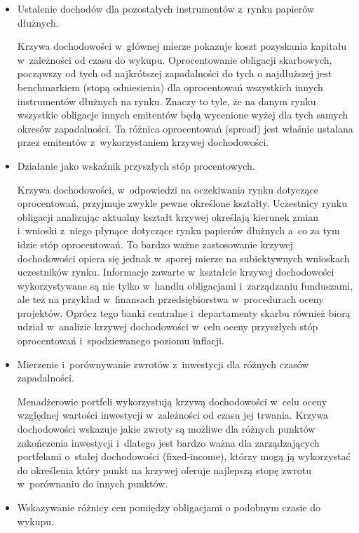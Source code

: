 \documentclass[12pt,a4paper,twoside,openany]{book}
\begin{document}
\begin{itemize}
\item Ustalenie dochodów dla pozostałych instrumentów z~rynku papierów dłużnych.

Krzywa dochodowości w~głównej mierze pokazuje koszt pozyskania kapitału w~zależności od czasu do wykupu. Oprocentowanie obligacji skarbowych, począwszy od tych od najkrótszej zapadalności do tych o najdłuższej jest benchmarkiem (stopą odniesienia) dla oprocentowań wszystkich innych instrumentów dłużnych na rynku. Znaczy to tyle, że na danym rynku wszystkie obligacje innych emitentów będą wycenione wyżej dla tych samych okresów zapadalności. Ta różnica oprocentowań (spread) jest właśnie ustalana przez emitentów z~wykorzystaniem krzywej dochodowości.

\item Działanie jako wskaźnik przyszłych stóp procentowych.

Krzywa dochodowości, w~odpowiedzi na oczekiwania rynku dotyczące oprocentowań, przyjmuje zwykle pewne określone kształty. Uczestnicy rynku obligacji analizując aktualny kształt krzywej określają kierunek zmian i~wnioski z~niego płynące dotyczące rynku papierów dłużnych a~co za tym idzie stóp oprocentowań. To bardzo ważne zastosowanie krzywej dochodowości opiera się jednak w~sporej mierze na subiektywnych wnioskach uczestników rynku. Informacje zawarte w~kształcie krzywej dochodowości wykorzystywane są nie tylko w~handlu obligacjami i~zarządzaniu funduszami, ale też na przykład w~finansach przedsiębiorstwa w~procedurach oceny projektów. Oprócz tego banki centralne i~departamenty skarbu również biorą udział w~analizie krzywej dochodowości w~celu oceny przyszłych stóp oprocentowań i~spodziewanego poziomu inflacji.

\item Mierzenie i~porównywanie zwrotów z~inwestycji dla różnych czasów zapadalności.

Menadżerowie portfeli wykorzystują krzywą dochodowości w~celu oceny względnej wartości inwestycji w~zależności od czasu jej trwania. Krzywa dochodowości wskazuje jakie zwroty są możliwe dla różnych punktów zakończenia inwestycji i~dlatego jest bardzo ważna dla zarządzających portfelami o~stałej dochodowości (fixed-income), którzy mogą ją wykorzystać do określenia który punkt na krzywej oferuje najlepszą stopę zwrotu w~porównaniu do innych punktów.

\item Wskazywanie różnicy cen pomiędzy obligacjami o podobnym czasie do wykupu.


\end{itemize}
\end{document}
